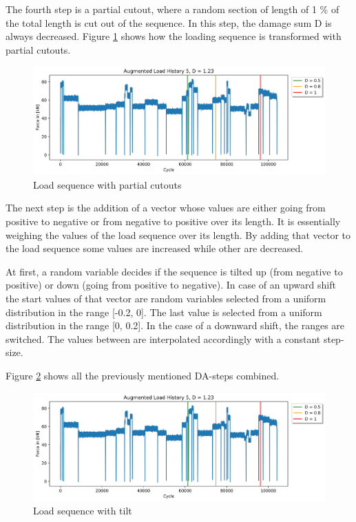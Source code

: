 The fourth step is a partial cutout, where a random section of length of 1 \% of the total length is cut out of the sequence. In this step, the damage sum D is always decreased. Figure \ref{fig:Verlauf_5_cutout} shows how the loading sequence is transformed with partial cutouts.

\begin{figure}[H]
	\centering
	\includegraphics[width=1\linewidth]{IMGs/Verlauf_5_coutout.jpg}
	\caption{Load sequence with partial cutouts}
	\label{fig:Verlauf_5_cutout}
\end{figure}
\newpage
The next step is the addition of a vector whose values are either going from positive to negative or from negative to positive over its length. It is essentially weighing the values of the load sequence over its length. By adding that vector to the load sequence some values are increased while other are decreased. 

At first, a random variable decides if the sequence is tilted up (from negative to positive) or down (going from positive to negative). In case of an upward shift the start values of that vector are random variables selected from a uniform distribution in the range [-0.2, 0]. The last value is selected from a uniform distribution in the range [0, 0.2]. In the case of a downward shift, the ranges are switched.
The values between are interpolated accordingly with a constant step-size.


Figure \ref{fig:Verlauf_5_tilt} shows all the previously mentioned DA-steps combined.

\begin{figure}[H]
	\centering
	\includegraphics[width=1\linewidth]{IMGs/Verlauf_5_tilt.jpg}
	\caption{Load sequence with tilt}
	\label{fig:Verlauf_5_tilt}
\end{figure}

